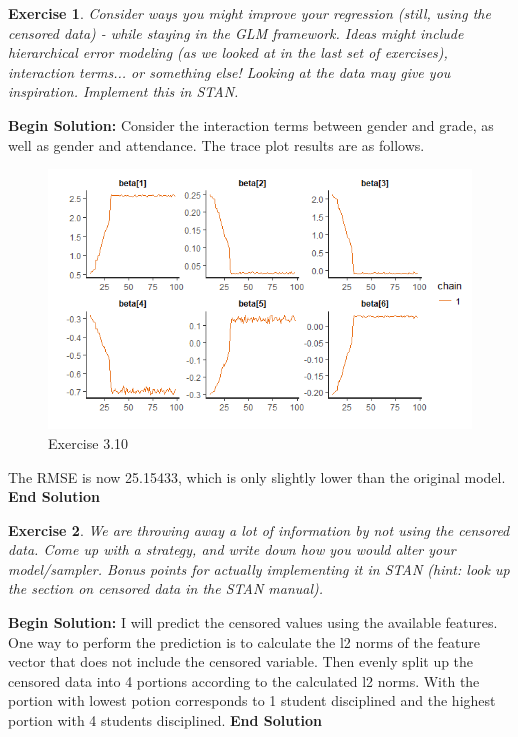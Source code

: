 \documentclass[twoside]{article}
\newcounter{lecnum}
\newtheorem{exercise}{Exercise}[lecnum]
\begin{document}
  \begin{exercise}
    Consider ways you might improve your regression (still, using the censored data) - while staying in the GLM framework.  Ideas might include hierarchical error modeling (as we looked at in the last set of exercises), interaction terms... or something else! Looking at the data may give you inspiration. Implement this in STAN.
  \end{exercise}
\textbf{Begin Solution:}
Consider the interaction terms between gender and grade, as well as gender and attendance. The trace plot results are as follows.\\
\begin{figure}[H]
\begin{center}
\includegraphics[width=\textwidth]{./MATLAB/3.9/beta6.png}
\end{center}
\caption{Exercise 3.10}
\label{Feature: Grade and some more and more}
\end{figure}
The RMSE is now 25.15433, which is only slightly lower than the original model.\\
\textbf{End Solution}
  
  \begin{exercise}
    We are throwing away a lot of information by not using the censored data. Come up with a strategy, and write down how you would alter your model/sampler. Bonus points for actually implementing it in STAN (hint: look up the section on censored data in the STAN manual).
  \end{exercise}
\textbf{Begin Solution:}
I will predict the censored values using the available features. One way to perform the prediction is to calculate the l2 norms of the feature vector that does not include the censored variable. Then evenly split up the censored data into 4 portions according to the calculated l2 norms. With the portion with lowest potion corresponds to 1 student disciplined and the highest portion with 4 students disciplined.
\textbf{End Solution}
  
  
\end{document}
